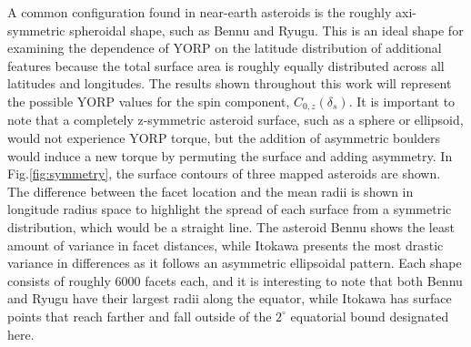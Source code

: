A common configuration found in near-earth asteroids is the roughly axi-symmetric spheroidal shape, such as Bennu and Ryugu. This is an ideal shape for examining the dependence of YORP on the latitude distribution of additional features because the total surface area is roughly equally distributed across all latitudes and longitudes. The results shown throughout this work will represent the possible YORP values for the spin component, $C_{0,z}(\delta_{s})$. It is important to note that a completely z-symmetric asteroid surface, such as a sphere or ellipsoid, would not experience YORP torque, but the addition of asymmetric boulders would induce a new torque by permuting the surface and adding asymmetry. 
In Fig.\ref{fig:symmetry}, the surface contours of three mapped asteroids are shown. The difference between the facet location and the mean radii is shown in longitude radius space to highlight the spread of each surface from a symmetric distribution, which would be a straight line. The asteroid Bennu shows the least amount of variance in facet distances, while Itokawa presents the most drastic variance in differences as it follows an asymmetric ellipsoidal pattern. Each shape consists of roughly 6000 facets each, and it is interesting to note that both Bennu and Ryugu have their largest radii along the equator, while Itokawa has surface points that reach farther and fall outside of the $2^{\circ}$ equatorial bound designated here.
\begin{table}[b!]
    \renewcommand{\arraystretch}{1.5}

    \caption{Bennu's Properties and Itokawa's Properties}
    \label{table:asteroid_values}
\end{table}

